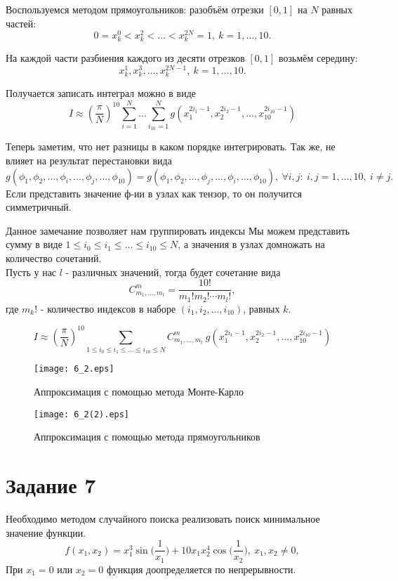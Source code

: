 \documentclass[11pt]{article}
\begin{document}
Воспользуемся методом прямоугольников: разобъём отрезки $[0,1]$ на $N$ равных частей:
$$
0=x_k^0<x_k^2<\ldots<x_k^{2 N}=1,~ k=1, \ldots, 10.
$$

На каждой части разбиения каждого из десяти отрезков $[0,1]$ возьмём середину:
$$
x_k^1, x_k^3, \ldots, x_k^{2 N-1},~ k=1, \ldots, 10.
$$

Получается записать интеграл можно в виде
$$
    I \approx \left( \dfrac{\pi}{N} \right)^{10} \sum_{i=1}^{N}\dots\sum_{i_{10}=1}^{N} g(x_1^{2i_1 - 1}, x_2^{2i_2 - 1}, \dots, x_{10}^{2i_{10} - 1})
$$

Теперь заметим, что нет разницы в каком порядке интегрировать. Так же, не влияет на результат перестановки вида 
$$
g(\phi_1,\phi_2,\ldots, \phi_i,\ldots, \phi_j, \ldots,\phi_{10}) = g(\phi_1,\phi_2,\ldots, \phi_j,\ldots, \phi_i, \ldots,\phi_{10}),
~ \forall i, j:~ i,j = 1, \ldots, 10,~ i \ne j.
$$
Если представить значение ф-ии в узлах как тензор, то он получится симметричный.

Данное замечание позволяет нам группировать индексы 
Мы можем представить сумму в виде $1\leq i_0\leq i_1\leq\dots \leq i_{10}\leq N$, а значения в узлах домножать на количество сочетаний. \\
Пусть у нас $l$ - различных значений, тогда будет сочетание вида
$$
 C^{m}_{m_1, \ldots, m_l} = \frac{10!}{m_1!m_2!\cdots m_{l}!},
$$
где $m_k!$ - количество индексов в наборе $(i_1,i_2,\dots,i_{10})$, равных $k$.

$$
    I \approx \left( \dfrac{\pi}{N} \right)^{10} \sum_{1\leq i_0\leq i_1\leq\dots \leq i_{10}\leq N} C^{m}_{m_1, \ldots, m_l} ~ g(x_1^{2i_1 - 1}, x_2^{2i_2 - 1}, \dots, x_{10}^{2i_{10} - 1})
$$


\begin{figure}[ht]
    \texttt{[image: 6\_2.eps]} 
    \caption{Аппроксимация с помощью метода Монте-Карло}
\end{figure} 

\begin{figure}[ht]
    \texttt{[image: 6\_2(2).eps]} 
    \caption{Аппроксимация с помощью метода прямоугольников}
\end{figure} 

\FloatBarrier

\section{Задание 7}
Необходимо методом случайного поиска реализовать поиск минимальное значение функции. 
$$
    f(x_1, x_2) = x_1 ^ 3 \sin{ \Big( \frac{1}{x_1} \Big)} + 10x_1 x_2^4 \cos{\Big( \frac{1}{x_2} \Big)},~ x_1, x_2 \ne 0,
$$
При $x_1 = 0$ или $x_2 = 0$ функция доопределяется по непрерывности.
\end{document}
